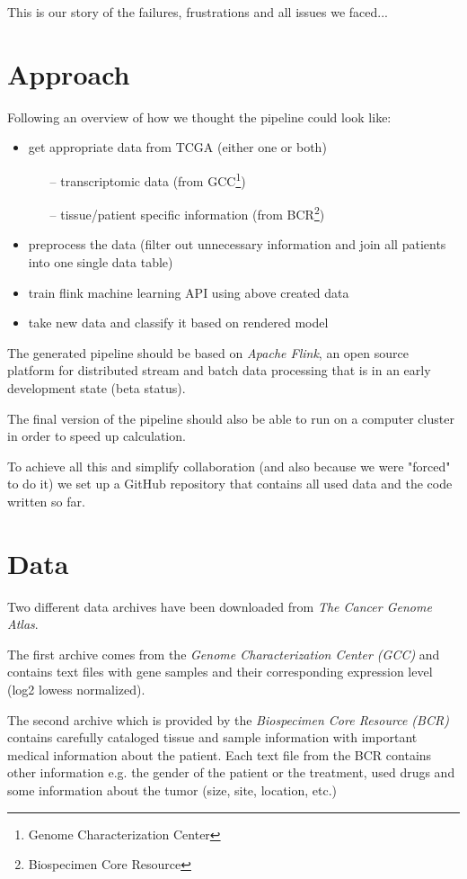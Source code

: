 \documentclass{bioinfo}
\begin{document}
This is our story of the failures, frustrations and all issues we faced... 


\section{Approach}

Following an overview of how we thought the pipeline could look like:
\begin{itemize}
\item get appropriate data from TCGA (either one or both)
\begin{itemize}
\item[--] transcriptomic data (from GCC\footnote{Genome Characterization Center})
\item[--] tissue/patient specific information (from BCR\footnote{Biospecimen Core Resource})
\end{itemize}
\item preprocess the data (filter out unnecessary information and join all patients into one single data table)
\item train flink machine learning API using above created data
\item take new data and classify it based on rendered model
\end{itemize}
The generated pipeline should be based on \emph{Apache Flink}, an open source platform for distributed stream and batch data processing that is in an early development state (beta status).

The final version of the pipeline should also be able to run on a computer cluster in order to speed up calculation.

To achieve all this and simplify collaboration (and also because we were "forced" to do it) we set up a GitHub repository that contains all used data and the code written so far.


\section{Data}

Two different data archives have been downloaded from \emph{The Cancer Genome Atlas}.

The first archive comes from the \emph{Genome Characterization Center (GCC)} and contains text files with gene samples and their corresponding expression level (log2 lowess normalized).

The second archive which is provided by the \emph{Biospecimen Core Resource (BCR)} contains carefully cataloged tissue and sample information with important medical information about the patient. Each text file from the BCR contains other information e.g. the gender of the patient or the treatment, used drugs and some information about the tumor (size, site, location, etc.)
\end{document}
